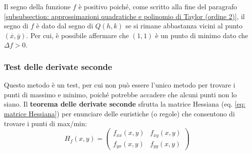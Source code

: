 \documentclass[a4paper]{article}
\begin{document}
	Il segno della funzione $f$ è positivo poiché, come scritto alla fine del paragrafo \ref{subsubsection: approssimazioni quadratiche e polinomio di Taylor (ordine 2)}, il segno di $f$ è dato dal segno di $Q\left(h,k\right)$ se si rimane abbastanza vicini al punto $\left(\overline{x}, \overline{y}\right)$. Per cui, è possibile affermare che $\left(1,1\right)$ è un punto di minimo dato che $\Delta f > 0$.

	\newpage
	
	\subsubsection{Test delle derivate seconde}\label{subsubsection: test delle derivate seconde}

	Questo metodo è un test, per cui non può essere l'unico metodo per trovare i punti di massimo e minimo, poiché potrebbe accadere che alcuni punti non lo siano. Il \textbf{teorema delle derivate seconde} sfrutta la matrice Hessiana (eq. \ref{eq: matrice Hessiana}) per enunciare delle euristiche (o regole) che consentono di trovare i punti di max/min:
	\begin{equation*}
		H_{f}\left(x,y\right) = 
		\begin{pmatrix}
			f_{xx}\left(x,y\right) & f_{xy}\left(x,y\right) \\
			f_{yx}\left(x,y\right) & f_{yy}\left(x,y\right)
		\end{pmatrix}
	\end{equation*}
\end{document}
